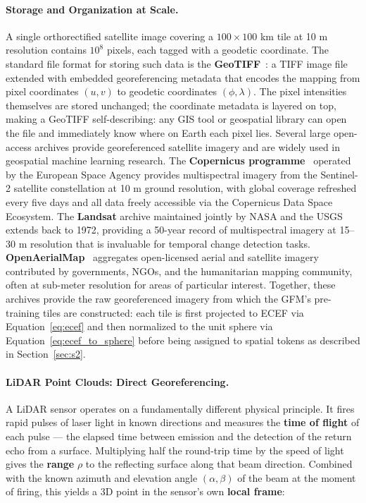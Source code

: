 \documentclass{book}
\begin{document}
\paragraph{Storage and Organization at Scale.}
A single orthorectified satellite image covering a
$100 \times 100$ km tile at 10 m resolution contains $10^8$ pixels,
each tagged with a geodetic coordinate.  The standard file format for
storing such data is the \textbf{GeoTIFF}~\cite{ritter1995geotiff}: a
TIFF image file extended with embedded georeferencing metadata that
encodes the mapping from pixel coordinates $(u, v)$ to geodetic
coordinates $(\phi, \lambda)$. The pixel intensities themselves are
stored unchanged; the coordinate metadata is layered on top, making a
GeoTIFF self-describing: any GIS tool or geospatial library can open
the file and immediately know where on Earth each pixel lies.
Several large open-access archives provide georeferenced satellite
imagery and are widely used in geospatial machine learning research.
The \textbf{Copernicus programme}~\cite{drusch2012sentinel} operated
by the European Space Agency provides multispectral imagery from the
Sentinel-2 satellite constellation at 10 m ground resolution, with
global coverage refreshed every five days and all data freely
accessible via the Copernicus Data Space Ecosystem.  The
\textbf{Landsat} archive maintained jointly by NASA and the
USGS~\cite{wulder2022landsat} extends back to 1972, providing a
50-year record of multispectral imagery at 15--30 m resolution that
is invaluable for temporal change detection tasks.
\textbf{OpenAerialMap}~\cite{openaerialmap2015} aggregates
open-licensed aerial and satellite imagery contributed by governments,
NGOs, and the humanitarian mapping community, often at sub-meter
resolution for areas of particular interest.  Together, these archives
provide the raw georeferenced imagery from which the GFM's
pre-training tiles are constructed: each tile is first projected to
ECEF via Equation~\eqref{eq:ecef} and then normalized to the unit
sphere via Equation~\eqref{eq:ecef_to_sphere} before being assigned
to spatial tokens as described in Section~\ref{sec:s2}.

 
\paragraph{LiDAR Point Clouds: Direct Georeferencing.}

A LiDAR sensor operates on a fundamentally different physical
principle.  It fires rapid pulses of laser light in known directions
and measures the \textbf{time of flight} of each pulse --- the elapsed
time between emission and the detection of the return echo from a
surface.  Multiplying half the round-trip time by the speed of light
gives the \textbf{range} $\rho$ to the reflecting surface along that
beam direction.  Combined with the known azimuth and elevation angle
$(\alpha, \beta)$ of the beam at the moment of firing, this yields a
3D point in the sensor's own \textbf{local frame}:
\end{document}
